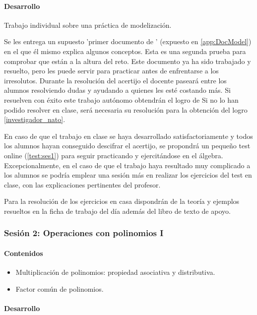 \paragraph{Desarrollo} Trabajo individual sobre una práctica de modelización.


Se les entrega un supuesto 'primer documento de \arab' (expuesto en \ref{app:DocModel}) en el que él mismo explica algunos conceptos.
%
Esta es una segunda prueba para comprobar que están a la altura del reto.
%
Este documento ya ha sido trabajado y resuelto, pero les puede servir para practicar antes de enfrentarse a los irresolutos.
%
Durante la resolución del acertijo el docente paseará entre los alumnos resolviendo dudas y ayudando a quienes les esté costando más. 
%
Si resuelven con éxito este trabajo autónomo obtendrán el logro de 
%
Si no lo han podido resolver en clase, será necesaria su resolución para la obtención del logro \ref{investigador_nato}.

En caso de que el trabajo en clase se haya desarrollado satisfactoriamente y todos los alumnos hayan conseguido descifrar el acertijo, se propondrá un pequeño test online (\ref{test:ses1}) para seguir practicando y ejercitándose en el álgebra.
%
Excepcionalmente, en el caso de que el trabajo haya resultado muy complicado a los alumnos se podría emplear una sesión más en realizar los ejercicios del test en clase, con las explicaciones pertinentes del profesor.

Para la resolución de los ejercicios en casa dispondrán de la teoría y ejemplos resueltos en la ficha de trabajo del día además del libro de texto de apoyo.


\subsubsection{Sesión 2: Operaciones con polinomios I}

\paragraph{Contenidos}
\begin{itemize}
	\item Multiplicación de polinomios: propiedad asociativa y distributiva.
	\item Factor común de polinomios.
\end{itemize}

\paragraph{Desarrollo}

